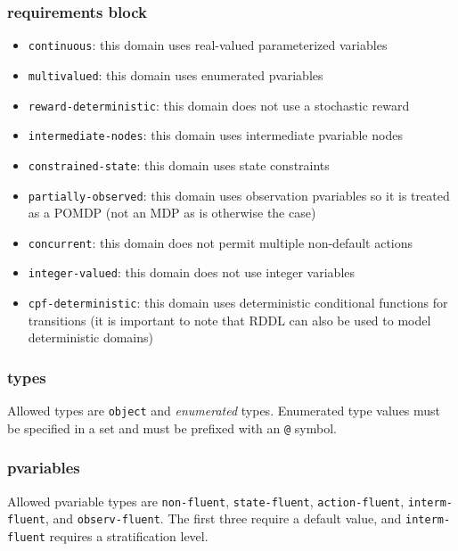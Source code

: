 \documentclass[11pt,a4paper]{article}
\begin{document}
\subsubsection{requirements block}

\label{sec:req}

\begin{itemize}
\item \texttt{continuous}: this domain uses real-valued parameterized variables
\item \texttt{multivalued}: this domain uses enumerated pvariables 
\item \texttt{reward-deterministic}: this domain does not use a stochastic reward
\item \texttt{intermediate-nodes}: this domain uses intermediate pvariable nodes
\item \texttt{constrained-state}: this domain uses state constraints
\item \texttt{partially-observed}: this domain uses observation pvariables so it is treated as a POMDP (not an MDP as is otherwise the case)
\item \texttt{concurrent}: this domain does not permit multiple non-default actions
\item \texttt{integer-valued}: this domain does not use integer variables
\item \texttt{cpf-deterministic}: this domain uses deterministic conditional functions for transitions (it is important to note that RDDL can also be used to model deterministic domains)
\end{itemize}

\subsubsection{types}

Allowed types are \texttt{object} and \emph{enumerated} types.
Enumerated type values must be specified in a set and 
must be prefixed with an \texttt{@} symbol.

\subsubsection{pvariables}

Allowed pvariable types are \texttt{non-fluent},
\texttt{state-fluent}, \texttt{action-fluent}, \texttt{interm-fluent},
and \texttt{observ-fluent}.  The first three require a default value,
and \texttt{interm-fluent} requires a stratification level.
\end{document}
